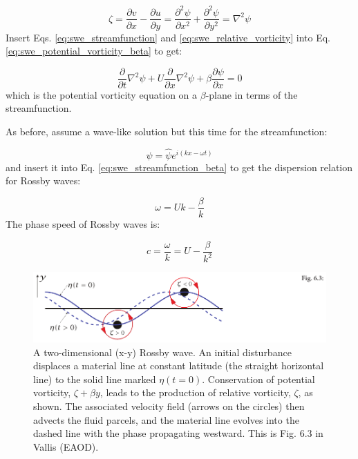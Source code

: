 \documentclass[12pt]{article}
\numberwithin{equation}{section}
\numberwithin{figure}{section}
\numberwithin{table}{section}
\begin{document}
\begin{equation}
  \zeta = \frac{\partial v}{\partial x} - \frac{\partial u}{\partial y} =
  \frac{\partial^2 \psi}{\partial x^2} + \frac{\partial^2 \psi}{\partial y^2}
  = \nabla^2 \psi
  \label{eq:swe_relative_vorticity}
\end{equation}
Insert Eqs. \ref{eq:swe_streamfunction} and \ref{eq:swe_relative_vorticity}
into Eq. \ref{eq:swe_potential_vorticity_beta} to get:

\begin{equation}
  \frac{\partial}{\partial t} \nabla^2 \psi + U \frac{\partial}{\partial x} \nabla^2 \psi + \beta \frac{\partial \psi}{\partial x} = 0
  \label{eq:swe_streamfunction_beta}
\end{equation}
which is the potential vorticity equation on a $\beta$-plane in terms of the
streamfunction.

As before, assume a wave-like solution but this time for the streamfunction:

\begin{equation}
  \psi = \widehat{\psi} e^{i(kx - \omega t)}
\end{equation}
and insert it into Eq. \ref{eq:swe_streamfunction_beta} to get the dispersion
relation for Rossby waves:

\begin{equation}
  \omega = U k - \frac{\beta}{k}
  \label{eq:swe_rossby_wave_dispersion_1d}
\end{equation}
The phase speed of Rossby waves is:

\begin{equation}
  c = \frac{\omega}{k} = U - \frac{\beta}{k^2}
  \label{eq:swe_rossby_wave_phase_speed_1d}
\end{equation}

\begin{figure}[h]
  \centering
  \includegraphics[width=\textwidth]{assets/fig_rossby_wave.pdf}
  \caption{
    A two-dimensional (x-y) Rossby wave.
    An initial disturbance displaces a material line at constant latitude
    (the straight horizontal line) to the solid line marked $\eta(t=0)$.
    Conservation of potential vorticity, $\zeta + \beta y$, leads to the
    production of relative vorticity, $\zeta$, as shown.
    The associated velocity field (arrows on the circles) then advects the
    fluid parcels, and the material line evolves into the dashed line with
    the phase propagating westward.
    This is Fig. 6.3 in Vallis (EAOD).
  }
  \label{fig:swe_rossby_wave}
\end{figure}
\end{document}
